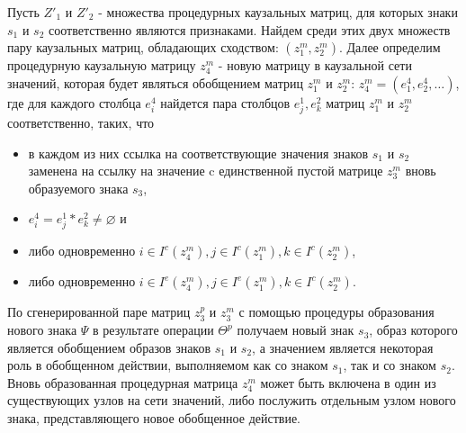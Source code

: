 \documentclass[12pt]{scrartcl}
\begin{document}
	Пусть $Z'_1$ и $Z'_2$ - множества процедурных каузальных матриц, для которых знаки $s_1$ и $s_2$ соответственно являются признаками. Найдем среди этих двух множеств пару каузальных матриц, обладающих сходством: $(z_1^m,z_2^m)$. Далее определим процедурную каузальную матрицу $z_4^m$ - новую матрицу в каузальной сети значений, которая будет являться обобщением матриц $z_1^m$ и $z_2^m$: $z_4^m=(e_1^4,e_2^4,\dots)$, где для каждого столбца $e_i^4$ найдется пара столбцов $e_j^1, e_k^2$ матриц $z_1^m$ и $z_2^m$ соответственно, таких, что
	\begin{itemize}
		\item в каждом из них ссылка на соответствующие значения знаков $s_1$ и $s_2$ заменена на ссылку на значение c единственной пустой матрице $z_3^m$ вновь образуемого знака $s_3$,
		\item $e_i^4=e_j^1*e_k^2\not=\varnothing$ и 
		\item либо одновременно $i\in I^c(z_4^m), j\in I^c(z_1^m), k\in I^c(z_2^m)$, 
		\item либо одновременно $i\in I^e(z_4^m), j\in I^e(z_1^m), k\in I^c(z_2^m)$.
	\end{itemize}
	
	По сгенерированной паре матриц $z_3^p$ и $z_3^m$ с помощью процедуры образования нового знака $\Psi$ в результате операции $\Theta^p$ получаем новый знак $s_3$, образ которого является обобщением образов знаков $s_1$ и $s_2$, а значением является некоторая роль в обобщенном действии, выполняемом как со знаком $s_1$, так и со знаком $s_2$. Вновь образованная процедурная матрица $z_4^m$ может быть включена в один из существующих узлов на сети значений, либо послужить отдельным узлом нового знака, представляющего новое обобщенное действие.
	
\end{document}
